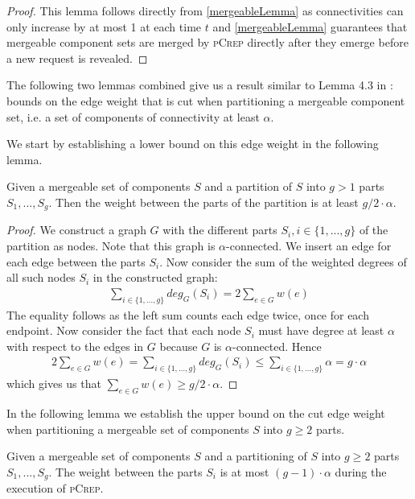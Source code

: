 \documentclass[a4paper,UKenglish,cleveref, autoref, thm-restate,authorcolumns]{lipics-v2019}
\newcommand{\adjDel}{\textsc{pCrep}}
\begin{document}
\begin{proof}
	This lemma follows directly from \cref{mergeableLemma} as connectivities can only increase by at most 1 at each time $t$ and \cref{mergeableLemma} guarantees that mergeable component sets are merged by \adjDel{} directly after they emerge before a new request is revealed.
\end{proof}

The following two lemmas combined give us a result similar to Lemma 4.3 in \cite{Avin2015}: bounds on the edge weight that is cut when partitioning a mergeable component set, i.e. a set of components of connectivity at least $\alpha$.

We start by establishing a lower bound on this edge weight in the following lemma.

\begin{lemma}
	\label{cut_lemma}
	Given a mergeable set of components $S$ and a partition of $S$ into $g>1$ parts $S_1,...,S_g$. Then the weight between the parts of the partition is at least $g/2 \cdot \alpha$.
\end{lemma}

\begin{proof}
	We construct a graph $G$ with the different parts $S_i, i\in\{1,...,g\}$ of the partition as nodes. Note that this graph is $\alpha$-connected. We insert an edge for each edge between the parts $S_i$. Now consider the sum of the weighted degrees of all such nodes $S_i$ in the constructed graph:
	\begin{align*}
	\sum_{i\in\{1,...,g\}}deg_G(S_i)=2\sum_{e\in G}w(e)
	\end{align*}
	The equality follows as the left sum counts each edge twice, once for each endpoint.
	Now consider the fact that each node $S_i$ must have degree at least $\alpha$ with respect to the edges in $G$ because $G$ is $\alpha$-connected. Hence
	\begin{align*}
	2\sum_{e\in G}w(e)=\sum_{i\in\{1,...,g\}}deg_G(S_i)\leq\sum_{i\in\{1,...,g\}}\alpha=g\cdot\alpha
	\end{align*}
	which gives us that $\sum_{e\in G}w(e)\geq g/2\cdot\alpha$.
\end{proof}

In the following lemma we establish the upper bound on the cut edge weight when partitioning a mergeable set of components $S$ into $g\geq2$ parts.

\begin{lemma}
	\label{cut_lemma_upper}
	Given a mergeable set of components $S$ and a partitioning of $S$ into $g\geq2$ parts $S_1,...,S_g$. The weight between the parts $S_i$ is at most $(g-1)\cdot\alpha$ during the execution of \adjDel{}.
\end{lemma}
\end{document}
